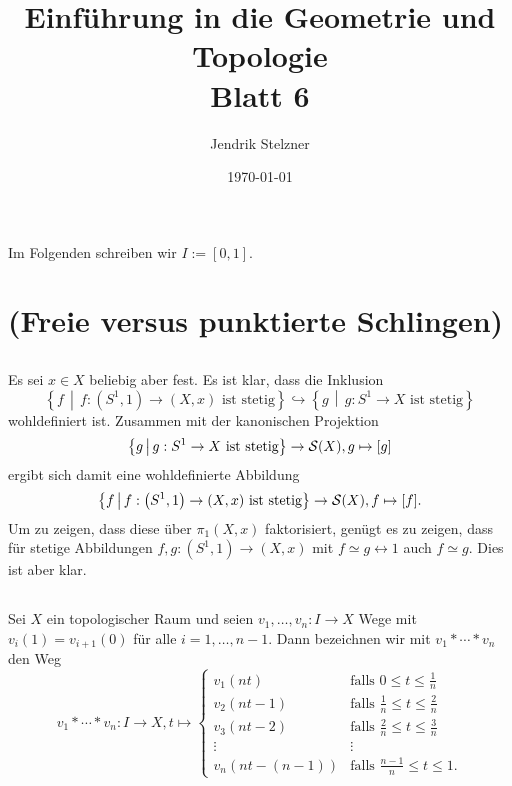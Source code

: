 \documentclass[a4paper,10pt]{article}
\title{\sc Einführung in die Geometrie und Topologie \\ \Large Blatt 6}
\author{Jendrik Stelzner}
\date{\today}
\begin{document}
\maketitle





Im Folgenden schreiben wir $I := [0,1]$.





\section{(Freie versus punktierte Schlingen)}


\subsection{}
Es sei $x \in X$ beliebig aber fest. Es ist klar, dass die Inklusion
\[
 \left\{ f \,\middle|\, f : \left(S^1,1\right) \to (X,x) \text{ ist stetig} \right\}
 \hookrightarrow
 \left\{ g \,\middle|\, g : S^1 \to X \text{ ist stetig}\right\}
 \]
wohldefiniert ist. Zusammen mit der kanonischen Projektion
\[
 \left\{ g \,\middle|\, g : S^1 \to X \text{ ist stetig}\right\} \to \mathcal{S}(X), g \mapsto [g]
\]
ergibt sich damit eine wohldefinierte Abbildung
\[
 \left\{ f \,\middle|\, f : \left(S^1,1\right) \to (X,x) \text{ ist stetig} \right\} \to \mathcal{S}(X), f \mapsto [f].
\]
Um zu zeigen, dass diese über $\pi_1(X,x)$ faktorisiert, genügt es zu zeigen, dass für stetige Abbildungen $f,g : (S^1, 1) \to (X, x)$ mit $f \simeq g \rel 1$ auch $f \simeq g$. Dies ist aber klar.


\subsection{}

\begin{defi}
 Sei $X$ ein topologischer Raum und seien $v_1, \ldots, v_n : I \to X$ Wege mit $v_i(1) = v_{i+1}(0)$ für alle $i=1,\ldots,n-1$. Dann bezeichnen wir mit $v_1 * \cdots * v_n$ den Weg
 \[
  v_1 * \cdots * v_n : I \to X, t \mapsto
  \begin{cases}
   v_1(nt)       & \text{falls } 0 \leq t \leq \frac{1}{n} \\
   v_2(nt-1)     & \text{falls } \frac{1}{n} \leq t \leq \frac{2}{n} \\
   v_3(nt-2)     & \text{falls } \frac{2}{n} \leq t \leq \frac{3}{n} \\
   \vdots        & \vdots \\
   v_n(nt-(n-1)) & \text{falls } \frac{n-1}{n} \leq t \leq 1.
  \end{cases}
 \]
\end{defi}
\end{document}
